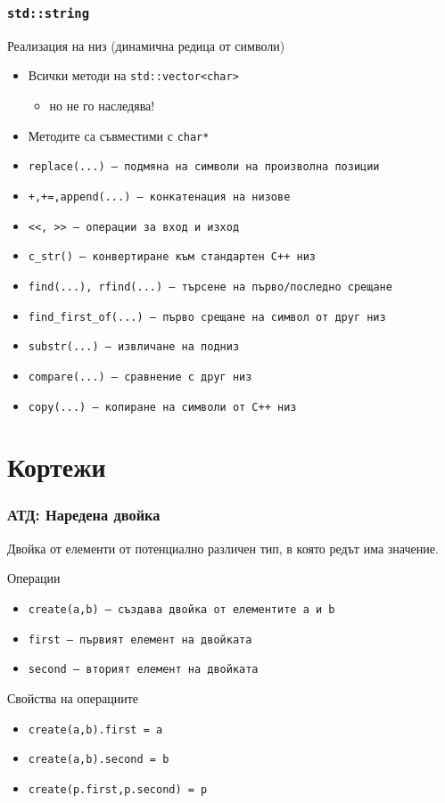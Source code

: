 \documentclass{beamer}
\begin{document}
\begin{frame}
  \frametitle{\tt{std::string}}

  Реализация на низ (динамична редица от символи)
  \begin{itemize}
  \item Всички методи на \tt{std::vector<char>}
    \begin{itemize}
    \item \alert{но не го наследява!}
    \end{itemize}
  \item Методите са съвместими с \tt{char*}
  \item \tt{replace(...)} --- подмяна на символи на произволна позиции
  \item \tt{+,+=,append(...)} --- конкатенация на низове
  \item \tt{<{}<, >{}>} --- операции за вход и изход
  \item \tt{c\_str()} --- конвертиране към стандартен C++ низ
  \item \tt{find(...), rfind(...)} --- търсене на първо/последно срещане
  \item \tt{find\_first\_of(...)} --- първо срещане на символ от друг низ
  \item \tt{substr(...)} --- извличане на подниз
  \item \tt{compare(...)} --- сравнение с друг низ
  \item \tt{copy(...)} --- копиране на символи от C++ низ
  \end{itemize}
\end{frame}

\section{Кортежи}

\begin{frame}
  \frametitle{АТД: Наредена двойка}

  Двойка от елементи от потенциално различен тип, в която редът има значение.
  \vspace{0.5em}

  Операции
  \vspace{0.5em}

  \begin{itemize}
  \item \tt{create(a,b)} --- създава двойка от елементите \tt a и \tt b
  \item \tt{first} --- първият елемент на двойката
  \item \tt{second} --- вторият елемент на двойката
  \end{itemize}
  \vspace{0.5em}

  Свойства на операциите
  \vspace{0.5em}

  \begin{itemize}
  \item \tt{create(a,b).first} = \tt a
  \item \tt{create(a,b).second} = \tt b
  \item \tt{create(p.first,p.second)} = \tt p
  \end{itemize}
\end{frame}
\end{document}
